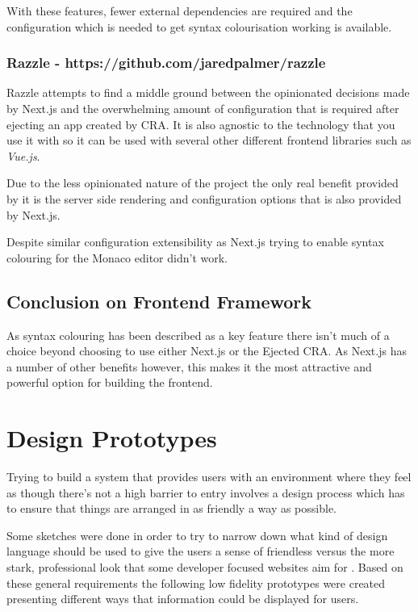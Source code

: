 With these features, fewer external dependencies are required and the configuration which is needed to get syntax colourisation working is available.

\subsubsection{Razzle - https://github.com/jaredpalmer/razzle}

Razzle attempts to find a middle ground between the opinionated decisions made by Next.js and the overwhelming amount of configuration that is required after ejecting an app created by CRA. It is also agnostic to the technology that you use it with so it can be used with several other different frontend libraries such as \textit{Vue.js}.

Due to the less opinionated nature of the project the only real benefit provided by it is the server side rendering and configuration options that is also provided by Next.js.

Despite similar configuration extensibility as Next.js trying to enable syntax colouring for the Monaco editor didn't work.

\subsection{Conclusion on Frontend Framework}

As syntax colouring has been described as a key feature there isn't much of a choice beyond choosing to use either Next.js or the Ejected CRA. As Next.js has a number of other benefits however, this makes it the most attractive and powerful option for building the frontend.

\section{Design Prototypes} \label{solapp-design}

Trying to build a system that provides users with an environment where they feel as though there's not a high barrier to entry involves a design process which has to ensure that things are arranged in as friendly a way as possible.

Some sketches were done in order to try to narrow down what kind of design language should be used to give the users a sense of friendless versus the more stark, professional look that some developer focused websites aim for \cite{stackoverflow}. Based on these general requirements the following low fidelity prototypes were created presenting different ways that information could be displayed for users.

